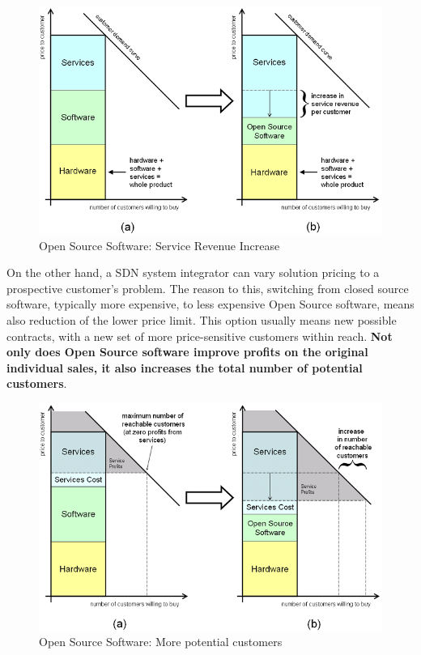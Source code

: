 \documentclass[a4paper, 12pt]{book}
\begin{document}
\begin{center}
 \begin{figure}[H]
 \begin{center}
   \includegraphics[width=15cm]{img/open-source-lower-cost-00.png}
   \caption{Open Source Software: Service Revenue Increase}
   \label{fig:oss_service_revenue}
 \end{center}
 \end{figure}
\end{center}
On the other hand, a SDN system integrator can vary solution pricing to a prospective customer's problem. The reason to this, switching from closed source software, typically more expensive, to less expensive Open Source software, means also reduction of the lower price limit. This option usually means new possible contracts, with a new set of more price-sensitive customers within reach. \textbf{Not only does Open Source software improve profits on the original individual sales, it also increases the total number of potential customers}.
\begin{center}
 \begin{figure}[H]
 \begin{center}
   \includegraphics[width=15cm]{img/open-source-lower-cost-01.png}
   \caption{Open Source Software: More potential customers}
   \label{fig:oss_more_customers}
 \end{center}
 \end{figure}
\end{center}
\end{document}
